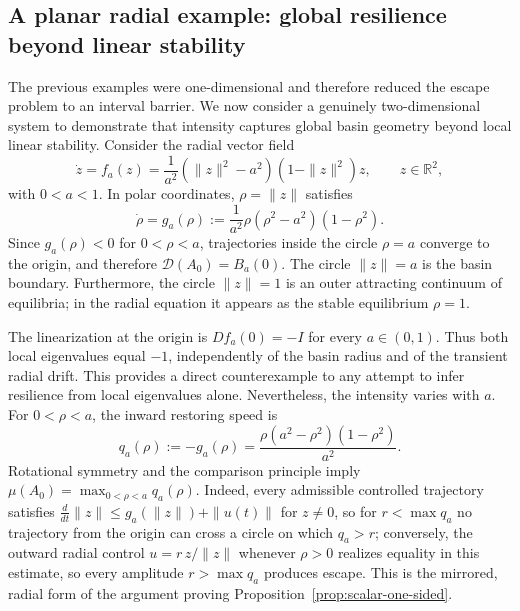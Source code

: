 \documentclass[pdflatex,sn-mathphys-num]{sn-jnl}
\numberwithin{equation}{section}
\theoremstyle{thmstyleone}%
\theoremstyle{definition}
\theoremstyle{remark}
\begin{document}
\subsection{A planar radial example: global resilience beyond linear stability}
\label{subsec:planar-radial-example}

The previous examples were one-dimensional and therefore reduced the escape problem to an interval barrier. We now consider a genuinely two-dimensional system to demonstrate that intensity captures global basin
geometry beyond local linear stability. Consider the radial vector field
\[
\dot z=f_a(z)
=
\frac1{a^2}
(\|z\|^2-a^2)(1-\|z\|^2)z,
\qquad z\in\mathbb R^2,
\]
with $0<a<1$. In polar coordinates, \(\rho=\|z\|\) satisfies 
\begin{equation}
\dot\rho = g_a(\rho) := \frac1{a^2} \rho(\rho^2-a^2)(1-\rho^2).
    \label{eq:radial-scalar-equation}
\end{equation}
Since $g_a(\rho)<0$ for $0<\rho<a$, trajectories inside the circle $\rho=a$ converge to the origin, and therefore $\mathcal D(A_0)=B_a(0)$. The circle \(\|z\|=a\) is the basin boundary. Furthermore, the circle $\|z\|=1$ is an outer attracting continuum of equilibria; in the radial equation it appears as the stable equilibrium $\rho=1$.

The linearization at the origin is \(Df_a(0)=-I\) for every \(a\in(0,1)\). Thus both local eigenvalues equal \(-1\), independently of the basin radius and of the transient radial drift. This provides a direct counterexample to any attempt to infer resilience from local eigenvalues alone. Nevertheless, the intensity varies with \(a\). For \(0<\rho<a\), the inward restoring speed is
\begin{equation}
    q_a(\rho)
    :=
    -g_a(\rho)
    =
    \frac{\rho(a^2-\rho^2)(1-\rho^2)}{a^2}.
    \label{eq:radial-restoring-speed}
\end{equation}
Rotational symmetry and the comparison principle imply
    $\mu(A_0)
    =
    \max_{0<\rho<a}q_a(\rho)$.
Indeed, every admissible controlled trajectory satisfies \(\tfrac{d}{dt}\|z\|\leq g_a(\|z\|)+\|u(t)\|\) for $z\neq 0$, so for \(r<\max q_a\) no trajectory from the origin can cross a circle on which \(q_a>r\); conversely, the outward radial control \(u=r\,z/\|z\|\) whenever $\rho>0$ realizes equality in this estimate, so every amplitude \(r>\max q_a\) produces escape. This is the mirrored, radial form of the argument proving Proposition~\ref{prop:scalar-one-sided}.
\end{document}
